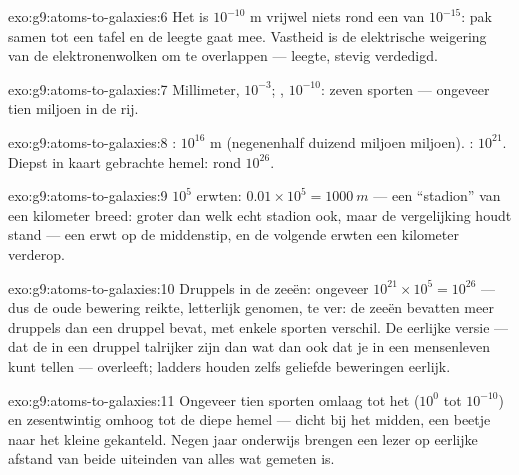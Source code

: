 \begin{solution}{exo:g9:atoms-to-galaxies:6}
Het  is $10^{-10}$ \unit{m} vrijwel niets rond een
 van $10^{-15}$: pak  samen tot een
tafel en de leegte gaat mee. Vastheid is de elektrische weigering van de
elektronenwolken om te overlappen --- leegte, stevig verdedigd.
\end{solution}

\begin{solution}{exo:g9:atoms-to-galaxies:7}
Millimeter, $10^{-3}$; , $10^{-10}$: zeven sporten ---
ongeveer tien miljoen  in de rij.
\end{solution}

\begin{solution}{exo:g9:atoms-to-galaxies:8}
: $10^{16}$ \unit{m} (negenenhalf duizend miljoen
miljoen). : $10^{21}$. Diepst in kaart gebrachte hemel:
rond $10^{26}$.
\end{solution}

\begin{solution}{exo:g9:atoms-to-galaxies:9}
$10^{5}$ erwten: $0.01 \times 10^{5} = \qty{1000}{m}$ --- een
``stadion'' van een kilometer breed: groter dan welk echt stadion ook,
maar de vergelijking houdt stand --- een erwt op de middenstip, en de
volgende erwten een kilometer verderop.
\end{solution}

\begin{solution}{exo:g9:atoms-to-galaxies:10}
Druppels in de zeeën: ongeveer $10^{21} \times 10^{5} = 10^{26}$ ---
dus de oude bewering reikte, letterlijk genomen, te ver: de zeeën
bevatten meer druppels dan een druppel  bevat, met
enkele sporten verschil. De eerlijke versie --- dat de
 in een druppel talrijker zijn dan wat dan ook dat je
in een mensenleven kunt tellen --- overleeft; ladders houden zelfs
geliefde beweringen eerlijk.
\end{solution}

\begin{solution}{exo:g9:atoms-to-galaxies:11}
Ongeveer tien sporten omlaag tot het  ($10^{0}$ tot
$10^{-10}$) en zesentwintig omhoog tot de diepe hemel --- dicht bij het
midden, een beetje naar het kleine gekanteld. Negen jaar onderwijs
brengen een lezer op eerlijke afstand van beide uiteinden van alles wat
gemeten is.
\end{solution}

